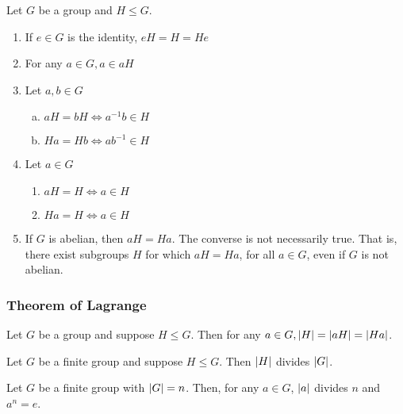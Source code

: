 \begin{remark}
    Let $G$ be a group and $H \leq G$. \\
    \begin{enumerate}
        \item If $e \in G$ is the identity, $eH = H = He$
        \item For any $a \in G, a \in aH$
        \item Let $a, b \in G$ \\
        \begin{enumerate}[a.]
            \item $aH = bH \Leftrightarrow a^{-1}b \in H$
            \item $Ha = Hb \Leftrightarrow ab^{-1} \in H$
        \end{enumerate}
        \item Let $a \in G$ \\
        \begin{enumerate}
            \item $aH = H \Leftrightarrow a \in H$
            \item $Ha = H \Leftrightarrow a \in H$
        \end{enumerate}
        \item If $G$ is abelian, then $aH = Ha$. The converse is not necessarily true. That is, there exist subgroups $H$ for which $aH = Ha$, for all $a \in G$, even if $G$ is not abelian.
    \end{enumerate}
\end{remark}

\subsubsection{Theorem of Lagrange}

\begin{theorem}
    Let $G$ be a group and suppose $H \leq G$. Then for any $a \in G, \qty|H| = \qty|aH| = \qty|Ha|$.
\end{theorem}

\begin{theorem}[Lagrange]
    Let $G$ be a finite group and suppose $H \leq G$. Then $\qty|H|$ divides $\qty|G|$.
\end{theorem}

\begin{corollary}
    Let $G$ be a finite group with $\qty|G| = n$. Then, for any $a \in G$, $\qty|a|$ divides $n$ and $a^n  = e$.
\end{corollary}

